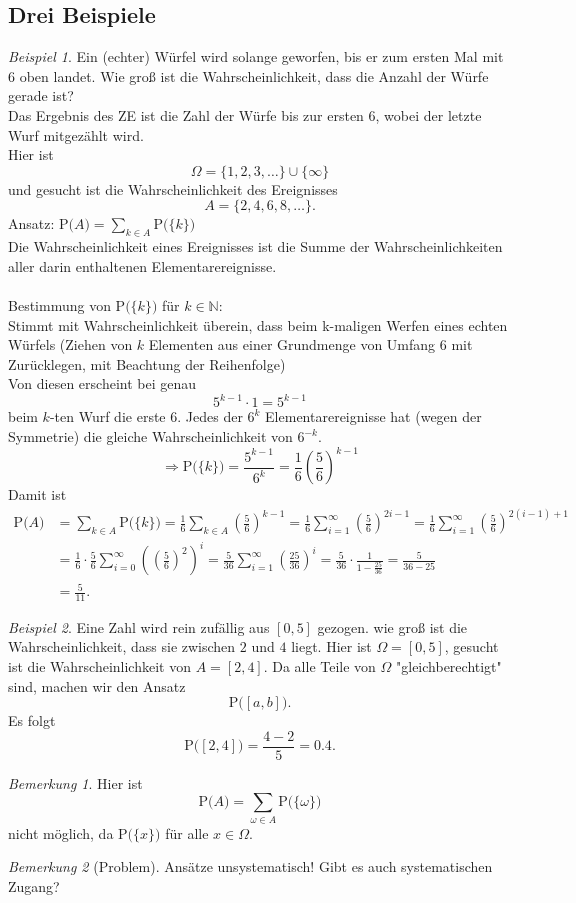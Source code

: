 \documentclass[a4paper,12pt,fleqn]{scrartcl}
\newcommand{\N}{\mathbb{N}}
\newcommand{\prob}[1]{\text{P(} #1 \text{)}}
\newcommand{\impl}{\Rightarrow}
\theoremstyle{definition}
\theoremstyle{plain}
\theoremstyle{remark}
\newtheorem*{bemerkung}{Bemerkung}
\newtheorem*{beispiel}{Beispiel}
\begin{document}
\subsection{Drei Beispiele}
\begin{beispiel}
Ein (echter) Würfel wird solange geworfen, bis er zum ersten Mal mit $6$ oben landet. Wie groß ist die Wahrscheinlichkeit, dass die Anzahl der Würfe gerade ist?\\
Das Ergebnis des ZE ist die Zahl der Würfe bis zur ersten $6$, wobei der letzte Wurf mitgezählt wird.\\
Hier ist
\[\Omega = \{1,2,3,\ldots\} \cup \{\infty\}\]
und gesucht ist die Wahrscheinlichkeit des Ereignisses
\[A=\{2,4,6,8,\ldots\}.\]
Ansatz: $\prob{A} = \sum_{k \in A} \prob{\{k\}}$ \\
Die Wahrscheinlichkeit eines Ereignisses ist die Summe der Wahrscheinlichkeiten aller darin enthaltenen Elementarereignisse.\\
\\
Bestimmung von $\prob{\{k\}}$ für $k \in \N$: \\
Stimmt mit Wahrscheinlichkeit überein, dass beim k-maligen Werfen eines echten Würfels (Ziehen von $k$ Elementen aus einer Grundmenge von Umfang $6$ mit Zurücklegen, mit Beachtung der Reihenfolge)\\
Von diesen erscheint bei genau
\[5^{k-1} \cdot 1 = 5^{k-1}\]
beim $k$-ten Wurf die erste $6$. Jedes der $6^{k}$ Elementarereignisse hat (wegen der Symmetrie) die gleiche Wahrscheinlichkeit von $6^{-k}$.
\[\impl \prob{\{k\}}=\frac{5^{k-1}}{6^{k}}=\frac{1}{6}(\frac{5}{6})^{k-1}\]
Damit ist
\begin{align*}
\prob{A}&=\sum_{k \in A} \prob{\{k\}}=\frac{1}{6}\sum_{k \in A}(\frac{5}{6})^{k-1}=\frac{1}{6}\sum_{i=1}^{\infty}(\frac{5}{6})^{2i-1}=\frac{1}{6}\sum_{i=1}^{\infty}(\frac{5}{6})^{2(i-1)+1} \\
&=\frac{1}{6}\cdot\frac{5}{6}\sum_{i=0}^{\infty}((\frac{5}{6})^{2})^{i}=\frac{5}{36}\sum_{i=1}^{\infty}(\frac{25}{36})^{i}=\frac{5}{36}\cdot\frac{1}{1-\frac{25}{36}}=\frac{5}{36-25} \\
&=\frac{5}{11}.
\end{align*}
\end{beispiel}


\begin{beispiel}
Eine Zahl wird rein zufällig aus $\left[ 0,5\right]$ gezogen. wie groß ist die Wahrscheinlichkeit, dass sie zwischen $2$ und $4$ liegt.  Hier ist $\Omega=\left[ 0,5\right]$, gesucht ist die Wahrscheinlichkeit von $A=\left[ 2,4\right]$. Da alle Teile von $\Omega$ "gleichberechtigt" sind, machen wir den Ansatz
\[\prob{\left[ a,b\right]}.\]
Es folgt
\[\prob{\left[ 2,4\right]}=\frac{4-2}{5}=0.4.\]
\begin{bemerkung}
Hier ist
\[\prob{A}=\sum_{\omega\in A}\prob{\{\omega \} }\]
nicht möglich, da $\prob{\{ x\} }$ für alle $x\in\Omega$.
\end{bemerkung}
\end{beispiel}
\begin{bemerkung}[Problem]
Ansätze unsystematisch! Gibt es auch systematischen Zugang?
\end{bemerkung}
\end{document}
